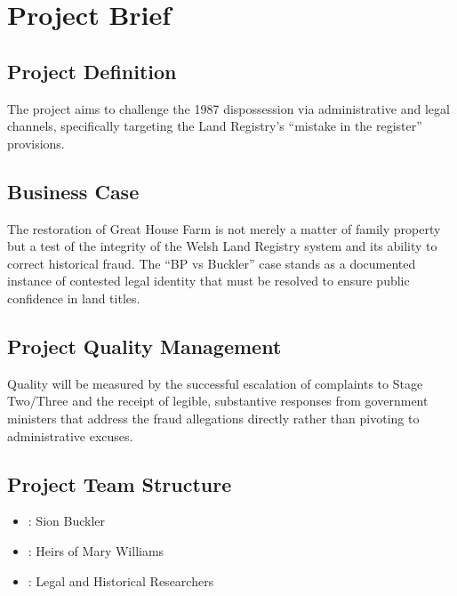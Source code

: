 \documentclass[letterpaper,10pt,openany,oneside,english]{sphinxmanual}
\begin{document}
\sphinxstepscope


\chapter{Project Brief}
\label{\detokenize{brief:project-brief}}\label{\detokenize{brief::doc}}

\section{Project Definition}
\label{\detokenize{brief:project-definition}}
\sphinxAtStartPar
The project aims to challenge the 1987 dispossession via administrative and legal channels, specifically targeting the Land Registry’s “mistake in the register” provisions.


\section{Business Case}
\label{\detokenize{brief:business-case}}
\sphinxAtStartPar
The restoration of Great House Farm is not merely a matter of family property but a test of the integrity of the Welsh Land Registry system and its ability to correct historical fraud. The “BP vs Buckler” case stands as a documented instance of contested legal identity that must be resolved to ensure public confidence in land titles.


\section{Project Quality Management}
\label{\detokenize{brief:project-quality-management}}
\sphinxAtStartPar
Quality will be measured by the successful escalation of complaints to Stage Two/Three and the receipt of legible, substantive responses from government ministers that address the fraud allegations directly rather than pivoting to administrative excuses.


\section{Project Team Structure}
\label{\detokenize{brief:project-team-structure}}\begin{itemize}
\item {} 
\sphinxAtStartPar
{}: Sion Buckler

\item {} 
\sphinxAtStartPar
{}: Heirs of Mary Williams

\item {} 
\sphinxAtStartPar
{}: Legal and Historical Researchers

\end{itemize}
\end{document}
